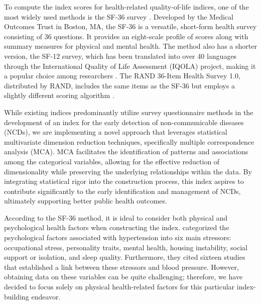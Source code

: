 \documentclass[
  12pt,
  a4paper]{article}
\begin{document}
To compute the index scores for health-related quality-of-life indices, one of the most widely used methods is the SF-36 survey \citep{ware1993sf}. Developed by the Medical Outcomes Trust in Boston, MA, the SF-36 is a versatile, short-form health survey consisting of 36 questions. It provides an eight-scale profile of scores along with summary measures for physical and mental health. The method also has a shorter version, the SF-12 survey, which has been translated into over 40 languages through the International Quality of Life Assessment (IQOLA) project, making it a popular choice among researchers \citep{ware199612}. The RAND 36-Item Health Survey 1.0, distributed by RAND, includes the same items as the SF-36 but employs a slightly different scoring algorithm \citep{hays1993rand}.

While existing indices predominantly utilize survey questionnaire methods in the development of an index for the early detection of non-communicable diseases (NCDs), we are implementing a novel approach that leverages statistical multivariate dimension reduction techniques, specifically multiple correspondence analysis (MCA). MCA facilitates the identification of patterns and associations among the categorical variables, allowing for the effective reduction of dimensionality while preserving the underlying relationships within the data. By integrating statistical rigor into the construction process, this index aspires to contribute significantly to the early identification and management of NCDs, ultimately supporting better public health outcomes.

According to the SF-36 method, it is ideal to consider both physical and psychological health factors when constructing the index. \citet{cuffee2014psychosocial} categorized the psychological factors associated with hypertension into six main stressors: occupational stress, personality traits, mental health, housing instability, social support or isolation, and sleep quality. Furthermore, they cited sixteen studies that established a link between these stressors and blood pressure. However, obtaining data on these variables can be quite challenging; therefore, we have decided to focus solely on physical health-related factors for this particular index-building endeavor.
\end{document}
